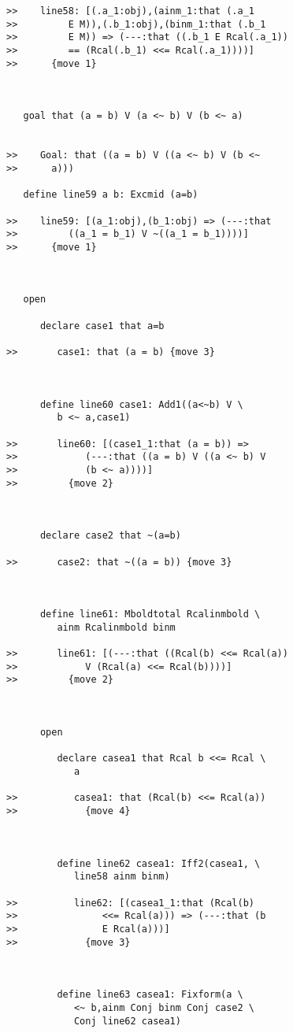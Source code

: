 \documentclass[12pt]{article}
\begin{document}
\begin{verbatim}
>>    line58: [(.a_1:obj),(ainm_1:that (.a_1
>>         E M)),(.b_1:obj),(binm_1:that (.b_1
>>         E M)) => (---:that ((.b_1 E Rcal(.a_1))
>>         == (Rcal(.b_1) <<= Rcal(.a_1))))]
>>      {move 1}



   goal that (a = b) V (a <~ b) V (b <~ a)


>>    Goal: that ((a = b) V ((a <~ b) V (b <~
>>      a)))

   define line59 a b: Excmid (a=b)

>>    line59: [(a_1:obj),(b_1:obj) => (---:that
>>         ((a_1 = b_1) V ~((a_1 = b_1))))]
>>      {move 1}



   open

      declare case1 that a=b

>>       case1: that (a = b) {move 3}



      define line60 case1: Add1((a<~b) V \
         b <~ a,case1)

>>       line60: [(case1_1:that (a = b)) =>
>>            (---:that ((a = b) V ((a <~ b) V
>>            (b <~ a))))]
>>         {move 2}



      declare case2 that ~(a=b)

>>       case2: that ~((a = b)) {move 3}



      define line61: Mboldtotal Rcalinmbold \
         ainm Rcalinmbold binm

>>       line61: [(---:that ((Rcal(b) <<= Rcal(a))
>>            V (Rcal(a) <<= Rcal(b))))]
>>         {move 2}



      open

         declare casea1 that Rcal b <<= Rcal \
            a

>>          casea1: that (Rcal(b) <<= Rcal(a))
>>            {move 4}



         define line62 casea1: Iff2(casea1, \
            line58 ainm binm)

>>          line62: [(casea1_1:that (Rcal(b)
>>               <<= Rcal(a))) => (---:that (b
>>               E Rcal(a)))]
>>            {move 3}



         define line63 casea1: Fixform(a \
            <~ b,ainm Conj binm Conj case2 \
            Conj line62 casea1)


\end{verbatim}
\end{document}
